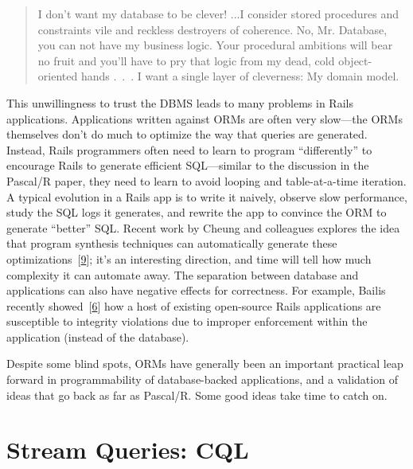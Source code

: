 \documentclass[b5paper,11pt,twoside,openright]{book}
\newcommand\Section[2]{
  \hypertarget{#1}{
    \section{#2}
  }
}
\begin{document}
\begin{quote}
  I don't want my database to be clever! ...I consider stored procedures
  and constraints vile and reckless destroyers of coherence. No, Mr.
  Database, you can not have my business logic. Your procedural ambitions
  will bear no fruit and you'll have to pry that logic from my dead, cold
  object-oriented hands \mbox{. . .} I want a single layer of cleverness: My
  domain model.
\end{quote}

This unwillingness to trust the DBMS leads to many problems in Rails
applications. Applications written against ORMs are often very
slow---the ORMs themselves don't do much to optimize the way that
queries are generated. Instead, Rails programmers often need to learn to
program ``differently'' to encourage Rails to generate efficient
SQL---similar to the discussion in the Pascal/R paper, they need to
learn to avoid looping and table-at-a-time iteration. A typical
evolution in a Rails app is to write it naively, observe slow
performance, study the SQL logs it generates, and rewrite the app to
convince the ORM to generate ``better'' SQL. Recent work by Cheung and
colleagues explores the idea that program synthesis techniques can
automatically generate these
optimizations~{{[}\protect\hyperlink{ref-statusquo}{9}{]}}; it's an
interesting direction, and time will tell how much complexity it can
automate away. The separation between database and applications can also
have negative effects for correctness. For example, Bailis recently
showed~{{[}\protect\hyperlink{ref-feral}{6}{]}} how a host of existing
open-source Rails applications are susceptible to integrity violations
due to improper enforcement within the application (instead of the
database).

Despite some blind spots, ORMs have generally been an important
practical leap forward in programmability of database-backed
applications, and a validation of ideas that go back as far as Pascal/R.
Some good ideas take time to catch on.

\Section{stream-queries-cql}{%
Stream Queries: CQL
}
\end{document}
